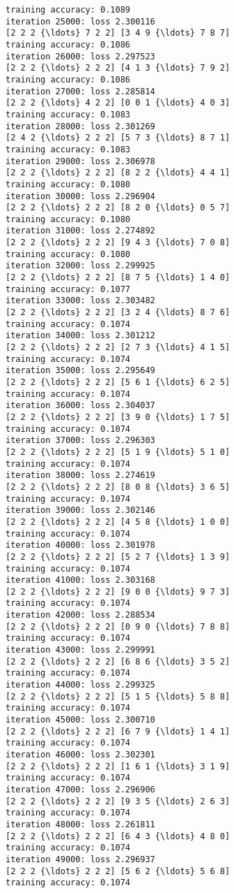 \documentclass[11pt]{article}
\begin{document}
\begin{Verbatim}[commandchars=\\\{\}]
training accuracy: 0.1089
iteration 25000: loss 2.300116
[2 2 2 {\ldots} 7 2 2] [3 4 9 {\ldots} 7 8 7]
training accuracy: 0.1086
iteration 26000: loss 2.297523
[2 2 2 {\ldots} 2 2 2] [4 1 3 {\ldots} 7 9 2]
training accuracy: 0.1086
iteration 27000: loss 2.285814
[2 2 2 {\ldots} 4 2 2] [0 0 1 {\ldots} 4 0 3]
training accuracy: 0.1083
iteration 28000: loss 2.301269
[2 4 2 {\ldots} 2 2 2] [5 7 3 {\ldots} 8 7 1]
training accuracy: 0.1083
iteration 29000: loss 2.306978
[2 2 2 {\ldots} 2 2 2] [8 2 2 {\ldots} 4 4 1]
training accuracy: 0.1080
iteration 30000: loss 2.296904
[2 2 2 {\ldots} 2 2 2] [8 2 0 {\ldots} 0 5 7]
training accuracy: 0.1080
iteration 31000: loss 2.274892
[2 2 2 {\ldots} 2 2 2] [9 4 3 {\ldots} 7 0 8]
training accuracy: 0.1080
iteration 32000: loss 2.299925
[2 2 2 {\ldots} 2 2 2] [8 7 5 {\ldots} 1 4 0]
training accuracy: 0.1077
iteration 33000: loss 2.303482
[2 2 2 {\ldots} 2 2 2] [3 2 4 {\ldots} 8 7 6]
training accuracy: 0.1074
iteration 34000: loss 2.301212
[2 2 2 {\ldots} 2 2 2] [2 7 3 {\ldots} 4 1 5]
training accuracy: 0.1074
iteration 35000: loss 2.295649
[2 2 2 {\ldots} 2 2 2] [5 6 1 {\ldots} 6 2 5]
training accuracy: 0.1074
iteration 36000: loss 2.304037
[2 2 2 {\ldots} 2 2 2] [3 9 0 {\ldots} 1 7 5]
training accuracy: 0.1074
iteration 37000: loss 2.296303
[2 2 2 {\ldots} 2 2 2] [5 1 9 {\ldots} 5 1 0]
training accuracy: 0.1074
iteration 38000: loss 2.274619
[2 2 2 {\ldots} 2 2 2] [8 0 8 {\ldots} 3 6 5]
training accuracy: 0.1074
iteration 39000: loss 2.302146
[2 2 2 {\ldots} 2 2 2] [4 5 8 {\ldots} 1 0 0]
training accuracy: 0.1074
iteration 40000: loss 2.301978
[2 2 2 {\ldots} 2 2 2] [5 2 7 {\ldots} 1 3 9]
training accuracy: 0.1074
iteration 41000: loss 2.303168
[2 2 2 {\ldots} 2 2 2] [9 0 0 {\ldots} 9 7 3]
training accuracy: 0.1074
iteration 42000: loss 2.288534
[2 2 2 {\ldots} 2 2 2] [0 9 0 {\ldots} 7 8 8]
training accuracy: 0.1074
iteration 43000: loss 2.299991
[2 2 2 {\ldots} 2 2 2] [6 8 6 {\ldots} 3 5 2]
training accuracy: 0.1074
iteration 44000: loss 2.299325
[2 2 2 {\ldots} 2 2 2] [5 1 5 {\ldots} 5 8 8]
training accuracy: 0.1074
iteration 45000: loss 2.300710
[2 2 2 {\ldots} 2 2 2] [6 7 9 {\ldots} 1 4 1]
training accuracy: 0.1074
iteration 46000: loss 2.302301
[2 2 2 {\ldots} 2 2 2] [1 6 1 {\ldots} 3 1 9]
training accuracy: 0.1074
iteration 47000: loss 2.296906
[2 2 2 {\ldots} 2 2 2] [9 3 5 {\ldots} 2 6 3]
training accuracy: 0.1074
iteration 48000: loss 2.261811
[2 2 2 {\ldots} 2 2 2] [6 4 3 {\ldots} 4 8 0]
training accuracy: 0.1074
iteration 49000: loss 2.296937
[2 2 2 {\ldots} 2 2 2] [5 6 2 {\ldots} 5 6 8]
training accuracy: 0.1074

\end{Verbatim}
\end{document}
